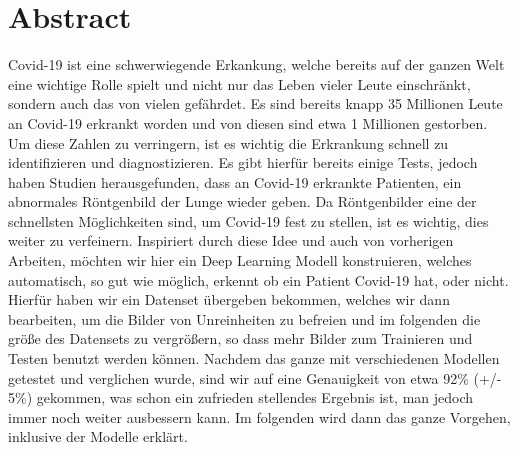 \section{Abstract}
\label{ch:abstract}

Covid-19 ist eine schwerwiegende Erkankung, welche bereits auf der ganzen Welt eine wichtige Rolle spielt und nicht nur das Leben vieler Leute einschränkt, sondern auch das von vielen gefährdet. Es sind bereits knapp 35 Millionen Leute an Covid-19 erkrankt worden und von diesen sind etwa 1 Millionen gestorben. Um diese Zahlen zu verringern, ist es wichtig die Erkrankung schnell zu identifizieren und diagnostizieren. Es gibt hierfür bereits einige Tests, jedoch haben Studien herausgefunden, dass an Covid-19 erkrankte Patienten, ein abnormales Röntgenbild der Lunge wieder geben. Da Röntgenbilder eine der schnellsten Möglichkeiten sind, um Covid-19 fest zu stellen, ist es wichtig, dies weiter zu verfeinern. Inspiriert durch diese Idee und auch von vorherigen Arbeiten, möchten wir hier ein Deep Learning Modell konstruieren, welches automatisch, so gut wie möglich, erkennt ob ein Patient Covid-19 hat, oder nicht. Hierfür haben wir ein Datenset übergeben bekommen, welches wir dann bearbeiten, um die Bilder von Unreinheiten zu befreien und im folgenden die größe des Datensets zu vergrößern, so dass mehr Bilder zum Trainieren und Testen benutzt werden können. Nachdem das ganze mit verschiedenen Modellen getestet und verglichen wurde, sind wir auf eine Genauigkeit von etwa 92\% (+/- 5\%) gekommen, was schon ein zufrieden stellendes Ergebnis ist, man jedoch immer noch weiter ausbessern kann. Im folgenden wird dann das ganze Vorgehen, inklusive der Modelle erklärt.